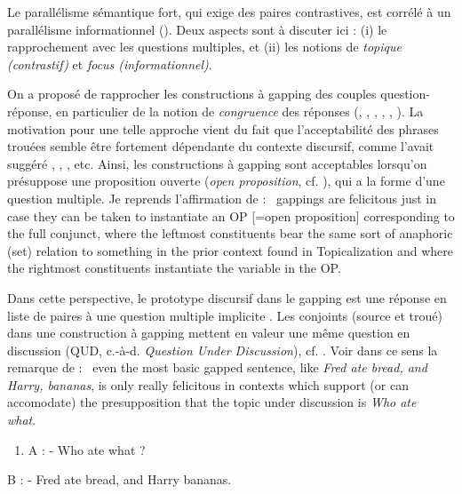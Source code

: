 Le parallélisme sémantique fort, qui exige des paires contrastives, est corrélé à un parallélisme informationnel (\citet{Winkler2005}). Deux aspects sont à discuter ici : (i) le rapprochement avec les questions multiples, et (ii) les notions de \textit{topique (contrastif)} et \textit{focus (informationnel)}.

On a proposé de rapprocher les constructions à gapping des couples question-réponse, en particulier de la notion de \textit{congruence} des réponses (\citet{Kuno1982}, \citet{Steedman2000}, \citet{Reich2006}, \citet{Winkler2005}, \citet{Hoyt2008}, \citet{Repp2009}). La motivation pour une telle approche vient du fait que l'acceptabilité des phrases trouées semble être fortement dépendante du contexte discursif, comme l'avait suggéré \citet{Kuno1976}, \citet{Prince1986}, \citet{Steedman2000}, etc. Ainsi, les constructions à gapping sont acceptables lorsqu'on présuppose une proposition ouverte (\textit{open proposition}, cf. \citet{Prince1986}), qui a la forme d'une question multiple. Je reprends l'affirmation de \citet[212]{Prince1986} : {\guillemotleft}~gappings are felicitous just in case they can be taken to instantiate an OP [=open proposition] corresponding to the full conjunct, where the leftmost constituents bear the same sort of anaphoric (set) relation to something in the prior context found in Topicalization and where the rightmost constituents instantiate the variable in the OP.~{\guillemotright}

Dans cette perspective, le prototype discursif dans le gapping est une réponse en liste de paires à une question multiple implicite . Les conjoints (source et troué) dans une construction à gapping mettent en valeur une même question en discussion (QUD, c.-à-d. \textit{Question Under Discussion}), cf. \citet{Reich2006}. Voir dans ce sens la remarque de \citet[248]{Steedman1990} : {\guillemotleft}~even the most basic gapped sentence, like \textit{Fred ate bread, and Harry, bananas}, is only really felicitous in contexts which support (or can accomodate) the presupposition that the topic under discussion is \textit{Who ate what}.~{\guillemotright} 


\begin{enumerate}
\item \label{bkm:Ref299699277}A : - Who ate what ?


\end{enumerate}
  B : - Fred ate bread, and Harry bananas.

